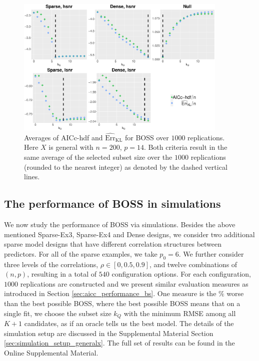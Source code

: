 \begin{figure}[ht!]
	\centering
	\includegraphics[width=0.9\textwidth]{figures/aicc_hdf_kl_boss.eps}
	\caption{Averages of AICc-hdf and $\widehat{\text{Err}}_{\text{KL}}$ for BOSS over $1000$ replications. Here $X$ is general with $n=200$, $p=14$. Both criteria result in the same average of the selected subset size over the $1000$ replications (rounded to the nearest integer) as denoted by the dashed vertical lines. }
	\label{fig:boss_aicc_hdf_kl}
\end{figure}


\subsection{The performance of BOSS in simulations}
\label{sec:boss_performance}
We now study the performance of BOSS via simulations. Besides the above mentioned Sparse-Ex3, Sparse-Ex4 and Dense designs, we consider two additional sparse model designs that have different correlation structures between predictors. For all of the sparse examples, we take $p_0=6$. We further consider three levels of the correlations, $\rho \in [0,0.5,0.9]$, and twelve combinations of $(n,p)$, resulting in a total of $540$ configuration options. For each configuration, $1000$ replications are constructed and we present similar evaluation measures as introduced in Section \ref{sec:aicc_performance_bs}. One measure is the $\%$ worse than the best possible BOSS, where the best possible BOSS means that on a single fit, we choose the subset size $k_Q$ with the minimum RMSE among all $K+1$ candidates, as if an oracle tells us the best model. The details of the simulation setup are discussed in the Supplemental Material Section \ref{sec:simulation_setup_generalx}. The full set of results can be found in the Online Supplemental Material.

